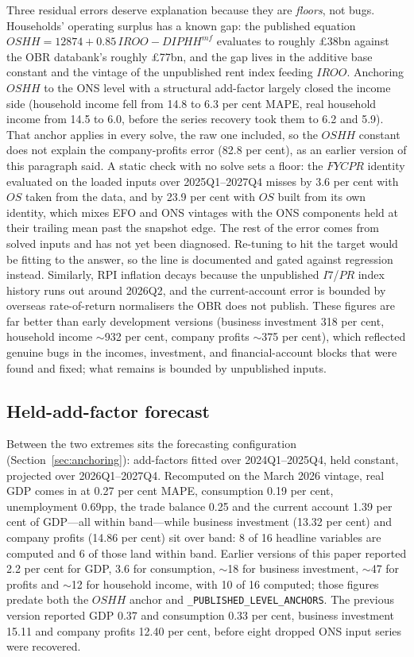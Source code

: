 Three residual errors deserve explanation because they are \emph{floors}, not bugs. Households' operating surplus has a known gap: the published equation $OSHH = 12874 + 0.85\,IROO - DIPHH^{mf}$ evaluates to roughly \pounds 38bn against the OBR databank's roughly \pounds 77bn, and the gap lives in the additive base constant and the vintage of the unpublished rent index feeding $IROO$. Anchoring $OSHH$ to the ONS level with a structural add-factor largely closed the income side (household income fell from 14.8 to 6.3 per cent MAPE, real household income from 14.5 to 6.0, before the series recovery took them to 6.2 and 5.9). That anchor applies in every solve, the raw one included, so the $OSHH$ constant does not explain the company-profits error (82.8 per cent), as an earlier version of this paragraph said. A static check with no solve sets a floor: the $FYCPR$ identity evaluated on the loaded inputs over 2025Q1--2027Q4 misses by 3.6 per cent with $OS$ taken from the data, and by 23.9 per cent with $OS$ built from its own identity, which mixes EFO and ONS vintages with the ONS components held at their trailing mean past the snapshot edge. The rest of the error comes from solved inputs and has not yet been diagnosed. Re-tuning to hit the target would be fitting to the answer, so the line is documented and gated against regression instead. Similarly, RPI inflation decays because the unpublished $I7$/$PR$ index history runs out around 2026Q2, and the current-account error is bounded by overseas rate-of-return normalisers the OBR does not publish. These figures are far better than early development versions (business investment 318 per cent, household income $\sim$932 per cent, company profits $\sim$375 per cent), which reflected genuine bugs in the incomes, investment, and financial-account blocks that were found and fixed; what remains is bounded by unpublished inputs.

\subsection{Held-add-factor forecast}

Between the two extremes sits the forecasting configuration (Section~\ref{sec:anchoring}): add-factors fitted over 2024Q1--2025Q4, held constant, projected over 2026Q1--2027Q4. Recomputed on the March 2026 vintage, real GDP comes in at 0.27 per cent MAPE, consumption 0.19 per cent, unemployment 0.69pp, the trade balance 0.25 and the current account 1.39 per cent of GDP---all within band---while business investment (13.32 per cent) and company profits (14.86 per cent) sit over band: 8 of 16 headline variables are computed and 6 of those land within band. Earlier versions of this paper reported 2.2 per cent for GDP, 3.6 for consumption, $\sim$18 for business investment, $\sim$47 for profits and $\sim$12 for household income, with 10 of 16 computed; those figures predate both the $OSHH$ anchor and \texttt{\_PUBLISHED\_LEVEL\_ANCHORS}. The previous version reported GDP 0.37 and consumption 0.33 per cent, business investment 15.11 and company profits 12.40 per cent, before eight dropped ONS input series were recovered.

